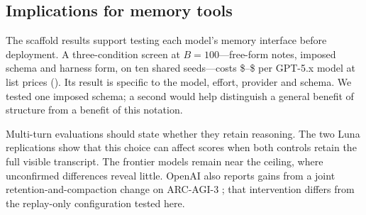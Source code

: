 \subsection{Implications for memory tools}\label{sec:discussion}

The scaffold results support testing each model's memory interface before deployment. A three-condition screen at $B{=}100$---free-form notes, imposed schema and harness form, on ten shared seeds---costs \$\relayfitcostnano{}--\$\relayfitcostsol{} per GPT-5.x model at list prices (). Its result is specific to the model, effort, provider and schema. We tested one imposed schema; a second would help distinguish a general benefit of structure from a benefit of this notation.

Multi-turn evaluations should state whether they retain reasoning. The two Luna replications show that this choice can affect scores when both controls retain the full visible transcript. The frontier models remain near the ceiling, where unconfirmed differences reveal little. OpenAI also reports gains from a joint retention-and-compaction change on ARC-AGI-3 \citep{openai2026archarness}; that intervention differs from the replay-only configuration tested here.
